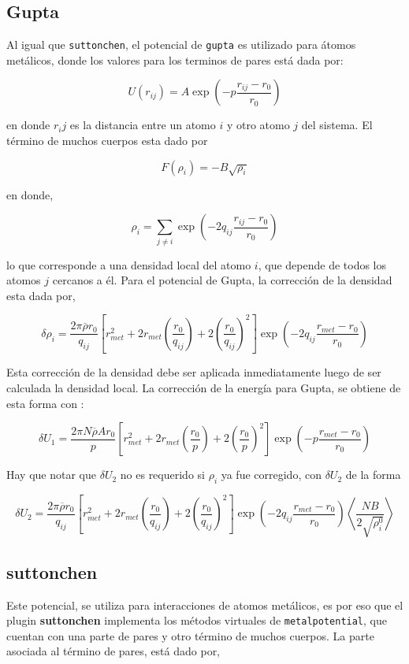 \subsection{Gupta}

Al igual que \verb|suttonchen|, el potencial de \verb|gupta| es utilizado para
\'atomos met\'alicos, donde los valores para los terminos de pares est\'a dada
por:

$$U(r_{ij}) = A\exp{\left(-p\frac{r_{ij}-r_0}{r_0}\right)}$$

en donde $r_ij$ es la distancia entre un atomo $i$ y otro atomo $j$ del sistema.
El t\'ermino de muchos cuerpos esta dado por

$$F(\rho_{i}) = -B\sqrt{\rho_i}$$

en donde,

$$\rho_i = \sum_{j\neq i} \exp{\left(-2q_{ij}\frac{r_{ij}-r_0}{r_0}\right)}$$

lo que corresponde a una densidad local del atomo $i$, que depende de todos los
atomos $j$ cercanos a \'el. Para el potencial de Gupta, la correcci\'on de la
densidad esta dada por,

$$\delta\rho_i=\frac{2\pi\overline{\rho}r_0}{q_{ij}}\left[r^2_{met}+2r_{met}
\left(\frac{r_0}{q_{ij}}\right)+2\left(\frac{r_0}{q_{ij}}\right)^2\right]\exp{
\left(-2q_{ij}\frac{r_{met}-r_0}{r_0}\right)}$$

Esta correcci\'on de la densidad debe ser aplicada inmediatamente luego de ser
calculada la densidad local. La correcci\'on de la energ\'ia para Gupta, se
obtiene de esta forma con :

$$\delta U_1 = \frac{2\pi N\overline{\rho}A
r_0}{p}\left[r^2_{met}+2r_{met}\left(\frac{r_0}{p}\right)+2\left(\frac{r_0}{p}
\right)^2\right]\exp{\left(-p\frac{r_{met}-r_0}{r_0}\right)}$$

Hay que notar que $\delta U_2$ no es requerido si $\rho_i$ ya fue corregido, con
$\delta U_2$ de la forma

$$\delta U_2 = \frac{2\pi\overline{\rho}
r_0}{q_{ij}}\left[r^2_{met}+2r_{met}\left(\frac{r_0}{q_{ij}}\right)+2\left(\frac
{r_0}{q_{ij}}\right)^2\right]\exp{\left(-2q_{ij}\frac{r_{met}-r_0}{r_0}\right)}
\left<\frac{NB}{2\sqrt{\rho_i^0}}\right>$$


\subsection{suttonchen}
Este potencial, se utiliza para interacciones de atomos met\'alicos, es por eso
que el plugin \textbf{suttonchen} implementa los m\'etodos virtuales de
\verb|metalpotential|, que cuentan con una parte de pares y otro t\'ermino de
muchos cuerpos. La parte asociada al t\'ermino de pares, est\'a dado por,

